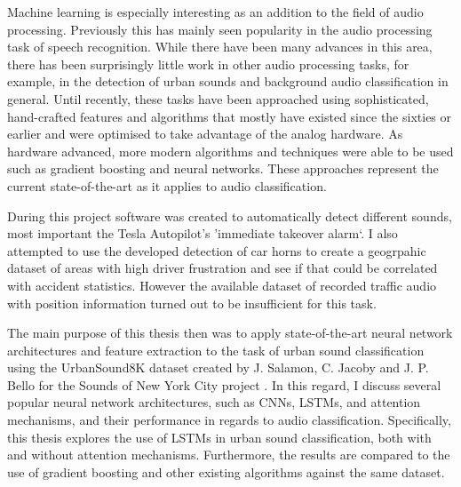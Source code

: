 
Machine learning is especially interesting as an addition to the field of audio processing. Previously this has mainly seen popularity in the audio processing task of speech recognition. While there have been many advances in this area, there has been surprisingly little work in other audio processing tasks, for example, in the detection of urban sounds and background audio classification in general. Until recently, these tasks have been approached using sophisticated, hand-crafted features and algorithms that mostly have existed since the sixties or earlier and were optimised to take advantage of the analog hardware. As hardware advanced, more modern algorithms and techniques were able to be used such as gradient boosting and neural networks. These approaches represent the current state-of-the-art as it applies to audio classification.



During this project software was created to automatically detect different sounds, most important the Tesla Autopilot's 'immediate takeover alarm`. I also attempted to use the developed detection of car horns to create a geogrpahic dataset of areas with high driver frustration and see if that could be correlated with accident statistics. However the available dataset of recorded traffic audio with position information turned out to be insufficient for this task.

The main purpose of this thesis then was to apply state-of-the-art neural network architectures and feature extraction to the task of urban sound classification using the UrbanSound8K dataset created by J. Salamon, C. Jacoby and J. P. Bello for the Sounds of New York City project \cite{Salamon:UrbanSound:ACMMM:14}. In this regard, I discuss several popular neural network architectures, such as CNNs, LSTMs, and attention mechanisms, and their performance in regards to audio classification. Specifically, this thesis explores the use of LSTMs in urban sound classification, both with and without attention mechanisms. Furthermore, the results are compared to the use of gradient boosting and other existing algorithms against the same dataset.

